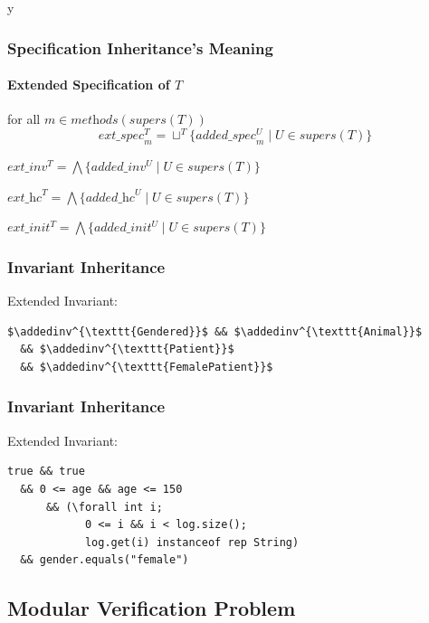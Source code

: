 \if y\MAKEHANDOUTS \documentclass[t,compress,landscape,handout]{beamer}
\newcommand{\spec}{{\textit{spec}}}
\newcommand{\inv}{{\textit{inv}}}
\newcommand{\hc}{{\textit{hc}}}
\newcommand{\init}{{\textit{init}}}
\newcommand{\added}[1]{{\textit{added}}\_#1}
\newcommand{\addedspec}{\added{\spec}}
\newcommand{\addedinv}{\added{\inv}}
\newcommand{\addedhc}{\added{\hc}}
\newcommand{\addedinit}{\added{\init}}
\newcommand{\ext}[1]{{\textit{ext}}\_#1}
\newcommand{\extspec}{\ext{\spec}}
\newcommand{\extinv}{\ext{\inv}}
\newcommand{\exthc}{\ext{\hc}}
\newcommand{\extinit}{\ext{\init}}
\newcommand{\join}{\ensuremath{\sqcup}}
\newcommand{\supers}{\textit{supers}}
\newcommand{\methods}{\textit{methods}}
\begin{document}
\begin{frame}
\frametitle{Specification Inheritance's Meaning}
\framesubtitle{Extended Specification of $T$}

\begin{description}[Constraint:]
\item[Methods:]
for all $m \in \methods(\supers(T))$
\begin{displaymath}
\extspec^T_m = \join^T \{\addedspec^U_m \mid U \in \supers(T)\}
\end{displaymath}

\item[Invariant:]
$\extinv^T = \bigwedge \{\addedinv^U \mid U \in \supers(T)\}$

\item[Constraint:]
$\exthc^T = \bigwedge \{\addedhc^U \mid U \in \supers(T)\}$

\item[Initially:]
$\extinit^T = \bigwedge \{\addedinit^U \mid U \in \supers(T)\}$
\end{description}
\end{frame}

\begin{frame}[fragile]
\frametitle{Invariant Inheritance}


Extended Invariant:

\begin{lstlisting}[mathescape=true]
  $\addedinv^{\texttt{Gendered}}$ && $\addedinv^{\texttt{Animal}}$
  && $\addedinv^{\texttt{Patient}}$
  && $\addedinv^{\texttt{FemalePatient}}$
\end{lstlisting}
\end{frame}

\begin{frame}[fragile]
\frametitle{Invariant Inheritance}


Extended Invariant:

\begin{lstlisting}[mathescape=true]
  true && true
  && 0 <= age && age <= 150
      && (\forall int i;
            0 <= i && i < log.size();
            log.get(i) instanceof rep String)
  && gender.equals("female")
\end{lstlisting}
\end{frame}

\subsection[Modularity]{Modular Verification Problem}
\end{document}
